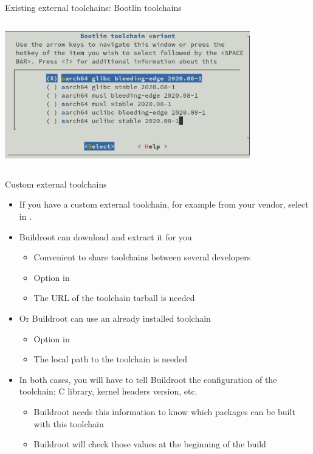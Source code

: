 \begin{frame}{Existing external toolchains: Bootlin toolchains}
\begin{columns}
\begin{center}
      \includegraphics[width=0.8\textwidth]{slides/buildroot-toolchain/bootlin-toolchains-menuconfig.png}
    \end{center}
  \end{columns}

\end{frame}

\begin{frame}{Custom external toolchains}
  \begin{itemize}
  \item If you have a custom external toolchain, for example from your
    vendor, select  in .
  \item Buildroot can download and extract it for you
    \begin{itemize}
    \item Convenient to share toolchains between several
      developers
    \item Option  in 
    \item The URL of the toolchain tarball is needed
    \end{itemize}
  \item Or Buildroot can use an already installed toolchain
    \begin{itemize}
    \item Option  in 
    \item The local path to the toolchain is needed
    \end{itemize}
  \item In both cases, you will have to tell Buildroot the
    configuration of the toolchain: C library, kernel headers version,
    etc.
    \begin{itemize}
    \item Buildroot needs this information to know which packages can
      be built with this toolchain
    \item Buildroot will check those values at the beginning of the
      build
    \end{itemize}
  \end{itemize}
\end{frame}

